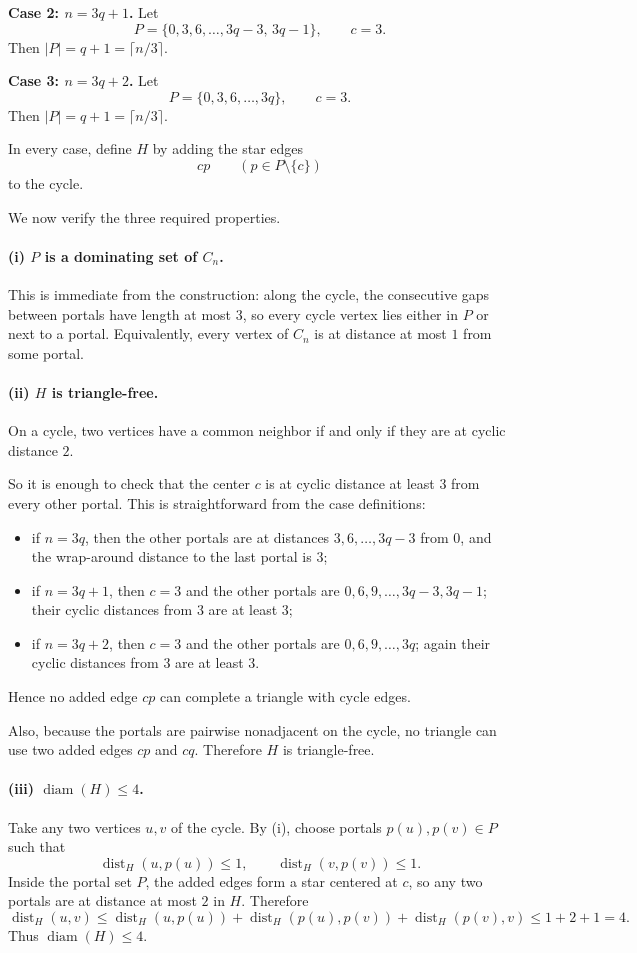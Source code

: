 \medskip
\noindent
\textbf{Case 2: $n=3q+1$.}
Let
\[
P=\{0,3,6,\dots,3q-3,\,3q-1\},
\qquad c=3.
\]
Then $|P|=q+1=\lceil n/3\rceil$.

\medskip
\noindent
\textbf{Case 3: $n=3q+2$.}
Let
\[
P=\{0,3,6,\dots,3q\},
\qquad c=3.
\]
Then $|P|=q+1=\lceil n/3\rceil$.

In every case, define $H$ by adding the star edges
\[
cp \qquad (p\in P\setminus\{c\})
\]
to the cycle.

We now verify the three required properties.

\paragraph{(i) $P$ is a dominating set of $C_n$.}
This is immediate from the construction: along the cycle, the consecutive gaps between portals have length at most $3$, so every cycle vertex lies either in $P$ or next to a portal. Equivalently, every vertex of $C_n$ is at distance at most $1$ from some portal.

\paragraph{(ii) $H$ is triangle-free.}
On a cycle, two vertices have a common neighbor if and only if they are at cyclic distance $2$.

So it is enough to check that the center $c$ is at cyclic distance at least $3$ from every other portal. This is straightforward from the case definitions:

\begin{itemize}
\item if $n=3q$, then the other portals are at distances $3,6,\dots,3q-3$ from $0$, and the wrap-around distance to the last portal is $3$;
\item if $n=3q+1$, then $c=3$ and the other portals are $0,6,9,\dots,3q-3,3q-1$; their cyclic distances from $3$ are at least $3$;
\item if $n=3q+2$, then $c=3$ and the other portals are $0,6,9,\dots,3q$; again their cyclic distances from $3$ are at least $3$.
\end{itemize}

Hence no added edge $cp$ can complete a triangle with cycle edges.

Also, because the portals are pairwise nonadjacent on the cycle, no triangle can use two added edges $cp$ and $cq$. Therefore $H$ is triangle-free.

\paragraph{(iii) $\operatorname{diam}(H)\le 4$.}
Take any two vertices $u,v$ of the cycle. By (i), choose portals $p(u),p(v)\in P$ such that
\[
\operatorname{dist}_H(u,p(u))\le 1,
\qquad
\operatorname{dist}_H(v,p(v))\le 1.
\]
Inside the portal set $P$, the added edges form a star centered at $c$, so any two portals are at distance at most $2$ in $H$. Therefore
\[
\operatorname{dist}_H(u,v)
\le
\operatorname{dist}_H(u,p(u))
+
\operatorname{dist}_H(p(u),p(v))
+
\operatorname{dist}_H(p(v),v)
\le 1+2+1=4.
\]
Thus $\operatorname{diam}(H)\le 4$.

